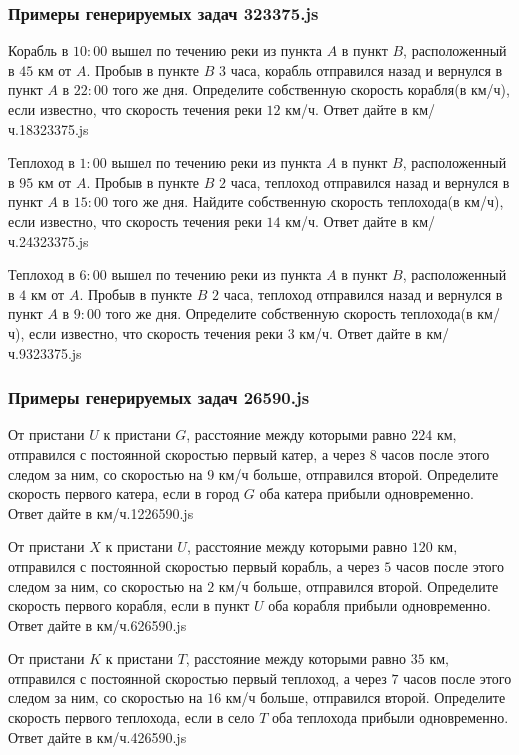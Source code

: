 
\subsubsection*{Примеры генерируемых задач 323375.js}   

\par{Корабль в $10:00$ вышел по течению реки из пункта $A$ в пункт $B$, расположенный в $45$ км от $A$. Пробыв в пункте $B$ $3$ часа, корабль отправился назад и вернулся в пункт $A$ в $22:00$ того же дня. Определите собственную скорость корабля(в км/ч), если известно, что скорость течения реки $12$ км/ч. Ответ дайте в км/ч.}{18}{323375.js}
\par{Теплоход в $1:00$ вышел по течению реки из пункта $A$ в пункт $B$, расположенный в $95$ км от $A$. Пробыв в пункте $B$ $2$ часа, теплоход отправился назад и вернулся в пункт $A$ в $15:00$ того же дня. Найдите собственную скорость теплохода(в км/ч), если известно, что скорость течения реки $14$ км/ч. Ответ дайте в км/ч.}{24}{323375.js}
\par{Теплоход в $6:00$ вышел по течению реки из пункта $A$ в пункт $B$, расположенный в $4$ км от $A$. Пробыв в пункте $B$ $2$ часа, теплоход отправился назад и вернулся в пункт $A$ в $9:00$ того же дня. Определите собственную скорость теплохода(в км/ч), если известно, что скорость течения реки $3$ км/ч. Ответ дайте в км/ч.}{9}{323375.js}	


\subsubsection*{Примеры генерируемых задач 26590.js}   

\par{От пристани $U$ к пристани $G$, расстояние между которыми равно $224$ км, отправился с постоянной скоростью первый катер, а через $8$ часов после этого следом за ним, со скоростью на $9$ км/ч больше, отправился второй. Определите скорость первого катера, если в город $G$ оба катера прибыли одновременно. Ответ дайте в км/ч.}{12}{26590.js}
\par{От пристани $X$ к пристани $U$, расстояние между которыми равно $120$ км, отправился с постоянной скоростью первый корабль, а через $5$ часов после этого следом за ним, со скоростью на $2$ км/ч больше, отправился второй. Определите скорость первого корабля, если в пункт $U$ оба корабля прибыли одновременно. Ответ дайте в км/ч.}{6}{26590.js}
\par{От пристани $K$ к пристани $T$, расстояние между которыми равно $35$ км, отправился с постоянной скоростью первый теплоход, а через $7$ часов после этого следом за ним, со скоростью на $16$ км/ч больше, отправился второй. Определите скорость первого теплохода, если в село $T$ оба теплохода прибыли одновременно. Ответ дайте в км/ч.}{4}{26590.js}

